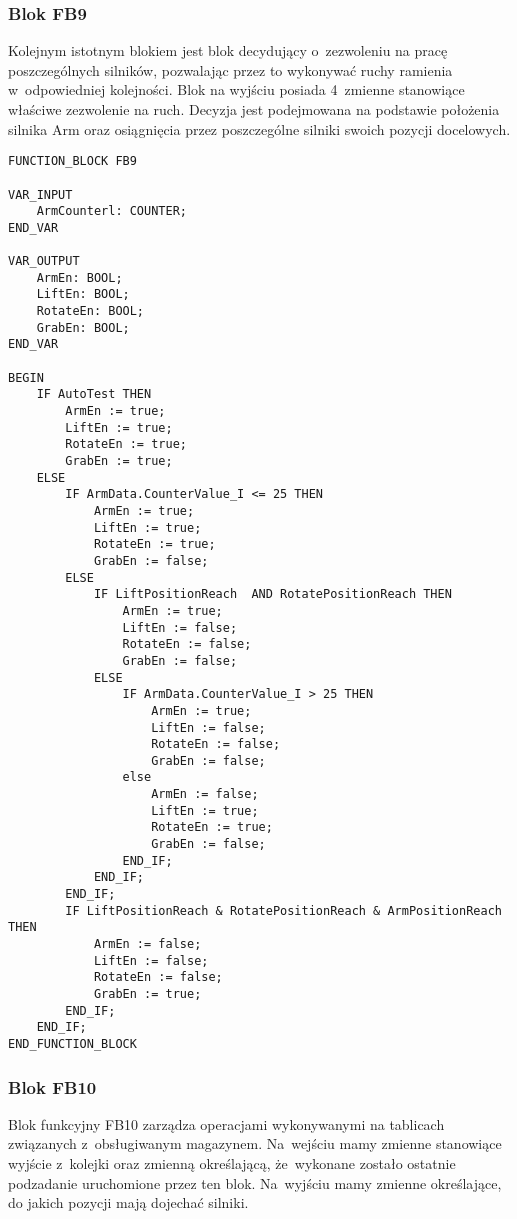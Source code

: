 \subsubsection{Blok FB9}
Kolejnym istotnym blokiem jest blok decydujący o~zezwoleniu na pracę poszczególnych silników, pozwalając przez to wykonywać ruchy ramienia w~odpowiedniej kolejności. Blok na wyjściu posiada 4~zmienne stanowiące właściwe zezwolenie na ruch. Decyzja jest podejmowana na podstawie położenia silnika Arm oraz osiągnięcia przez poszczególne silniki swoich pozycji docelowych.
\begin{lstlisting}[caption={FB9 - Zezwolenie na ruch}]
FUNCTION_BLOCK FB9

VAR_INPUT
    ArmCounterl: COUNTER;
END_VAR     

VAR_OUTPUT
    ArmEn: BOOL;
    LiftEn: BOOL;
    RotateEn: BOOL;
    GrabEn: BOOL;            
END_VAR     

BEGIN
    IF AutoTest THEN
        ArmEn := true;
        LiftEn := true;
        RotateEn := true;
        GrabEn := true;
    ELSE     
        IF ArmData.CounterValue_I <= 25 THEN
            ArmEn := true;
            LiftEn := true;
            RotateEn := true;
            GrabEn := false;
        ELSE
            IF LiftPositionReach  AND RotatePositionReach THEN        
                ArmEn := true;   
                LiftEn := false;
                RotateEn := false;
                GrabEn := false;  
            ELSE
                IF ArmData.CounterValue_I > 25 THEN
                    ArmEn := true;
                    LiftEn := false;
                    RotateEn := false;
                    GrabEn := false;
                else
                    ArmEn := false;   
                    LiftEn := true;
                    RotateEn := true;
                    GrabEn := false;              
                END_IF;
            END_IF;    
        END_IF;        
        IF LiftPositionReach & RotatePositionReach & ArmPositionReach THEN
            ArmEn := false;   
            LiftEn := false;
            RotateEn := false;
            GrabEn := true;    
        END_IF;    
    END_IF;           
END_FUNCTION_BLOCK
\end{lstlisting}

\subsubsection{Blok FB10}
Blok funkcyjny FB10 zarządza operacjami wykonywanymi na tablicach związanych z~obsługiwanym magazynem. Na~wejściu mamy zmienne stanowiące wyjście z~kolejki oraz zmienną określającą, że~wykonane zostało ostatnie podzadanie uruchomione przez ten blok. Na~wyjściu mamy zmienne określające, do jakich pozycji mają dojechać silniki. 

